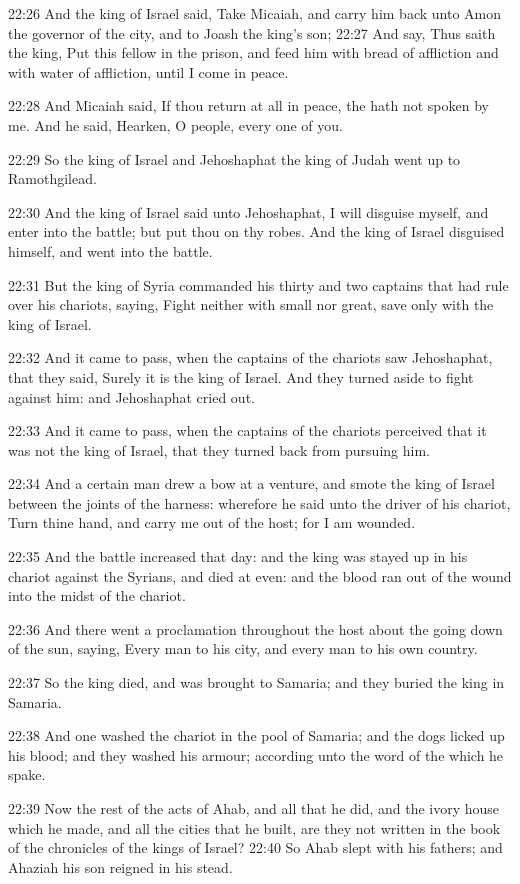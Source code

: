 22:26 And the king of Israel said, Take Micaiah, and carry him back unto Amon the governor of the city, and to Joash the king's son; 22:27 And say, Thus saith the king, Put this fellow in the prison, and feed him with bread of affliction and with water of affliction, until I come in peace.

22:28 And Micaiah said, If thou return at all in peace, the \LORD hath not spoken by me. And he said, Hearken, O people, every one of you.

22:29 So the king of Israel and Jehoshaphat the king of Judah went up to Ramothgilead.

22:30 And the king of Israel said unto Jehoshaphat, I will disguise myself, and enter into the battle; but put thou on thy robes. And the king of Israel disguised himself, and went into the battle.

22:31 But the king of Syria commanded his thirty and two captains that had rule over his chariots, saying, Fight neither with small nor great, save only with the king of Israel.

22:32 And it came to pass, when the captains of the chariots saw Jehoshaphat, that they said, Surely it is the king of Israel. And they turned aside to fight against him: and Jehoshaphat cried out.

22:33 And it came to pass, when the captains of the chariots perceived that it was not the king of Israel, that they turned back from pursuing him.

22:34 And a certain man drew a bow at a venture, and smote the king of Israel between the joints of the harness: wherefore he said unto the driver of his chariot, Turn thine hand, and carry me out of the host; for I am wounded.

22:35 And the battle increased that day: and the king was stayed up in his chariot against the Syrians, and died at even: and the blood ran out of the wound into the midst of the chariot.

22:36 And there went a proclamation throughout the host about the going down of the sun, saying, Every man to his city, and every man to his own country.

22:37 So the king died, and was brought to Samaria; and they buried the king in Samaria.

22:38 And one washed the chariot in the pool of Samaria; and the dogs licked up his blood; and they washed his armour; according unto the word of the \LORD which he spake.

22:39 Now the rest of the acts of Ahab, and all that he did, and the ivory house which he made, and all the cities that he built, are they not written in the book of the chronicles of the kings of Israel?  22:40 So Ahab slept with his fathers; and Ahaziah his son reigned in his stead.


